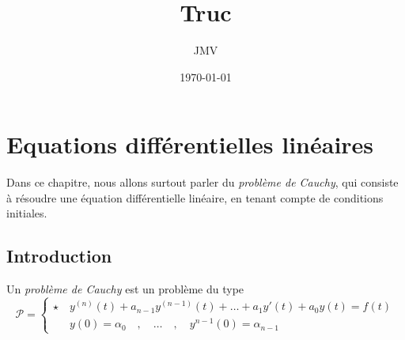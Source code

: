 \documentclass{report}
\title{Truc}
\author{JMV}
\date{\today}
\theoremstyle{definition}
\begin{document}
\chapter{Equations différentielles linéaires}

Dans ce chapitre, nous allons surtout parler du \emph{problème de Cauchy}, qui consiste à résoudre une équation différentielle linéaire, en tenant compte de conditions initiales.

\section{Introduction}

Un \emph{problème de Cauchy} est un problème du type
\[ \mathcal{P} = \begin{cases}
\star \quad y^{(n)}(t) + a_{n-1} y^{(n-1)} (t) + \ldots + a_1y'(t) + a_0y(t) = f(t) \\
\phantom{\star \quad} y(0)=\alpha_0 \quad , \quad \ldots \quad, \quad y^{n-1}(0) = \alpha_{n-1}
\end{cases} \]
\end{document}
